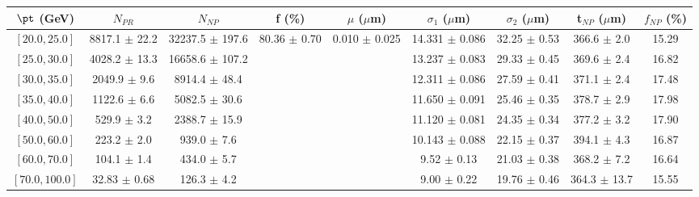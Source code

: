 \begin{tabular}{c||c|c|c|c|c|c|c||c}
$\pt$ (GeV) & $N_{PR}$ & $N_{NP}$ & f (\%) & $\mu$ ($\mu$m) & $\sigma_1$ ($\mu$m) & $\sigma_2$ ($\mu$m)  & t$_{NP}$ ($\mu$m) & $f_{NP}$ (\%) \\
\hline
$[20.0, 25.0]$ & 8817.1 $\pm$ 22.2 & 32237.5 $\pm$ 197.6 & \multirow{8}{*}{80.36 $\pm$ 0.70} & \multirow{8}{*}{0.010 $\pm$ 0.025} & 14.331 $\pm$ 0.086 & 32.25 $\pm$ 0.53 & 366.6 $\pm$ 2.0 & 15.29\\
$[25.0, 30.0]$ & 4028.2 $\pm$ 13.3 & 16658.6 $\pm$ 107.2 &  &  & 13.237 $\pm$ 0.083 & 29.33 $\pm$ 0.45 & 369.6 $\pm$ 2.4 & 16.82\\
$[30.0, 35.0]$ & 2049.9 $\pm$ 9.6 & 8914.4 $\pm$ 48.4 &  &  & 12.311 $\pm$ 0.086 & 27.59 $\pm$ 0.41 & 371.1 $\pm$ 2.4 & 17.48\\
$[35.0, 40.0]$ & 1122.6 $\pm$ 6.6 & 5082.5 $\pm$ 30.6 &  &  & 11.650 $\pm$ 0.091 & 25.46 $\pm$ 0.35 & 378.7 $\pm$ 2.9 & 17.98\\
$[40.0, 50.0]$ & 529.9 $\pm$ 3.2 & 2388.7 $\pm$ 15.9 &  &  & 11.120 $\pm$ 0.081 & 24.35 $\pm$ 0.34 & 377.2 $\pm$ 3.2 & 17.90\\
$[50.0, 60.0]$ & 223.2 $\pm$ 2.0 & 939.0 $\pm$ 7.6 &  &  & 10.143 $\pm$ 0.088 & 22.15 $\pm$ 0.37 & 394.1 $\pm$ 4.3 & 16.87\\
$[60.0, 70.0]$ & 104.1 $\pm$ 1.4 & 434.0 $\pm$ 5.7 &  &  & 9.52 $\pm$ 0.13 & 21.03 $\pm$ 0.38 & 368.2 $\pm$ 7.2 & 16.64\\
$[70.0, 100.0]$ & 32.83 $\pm$ 0.68 & 126.3 $\pm$ 4.2 &  &  & 9.00 $\pm$ 0.22 & 19.76 $\pm$ 0.46 & 364.3 $\pm$ 13.7 & 15.55\\
\end{tabular}
